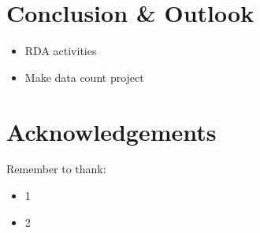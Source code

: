 \documentclass[conference, a4paper]{IEEEtran}\usepackage[]{graphicx}\usepackage[]{color}
\begin{document}
\section{Conclusion \& Outlook}\label{sec:conclusion}
\begin{itemize}
        \item RDA activities
        \item Make data count project
\end{itemize}


\section*{Acknowledgements}
Remember to thank:
\begin{itemize}
    \item 1
    \item 2
\end{itemize}



\end{document}
